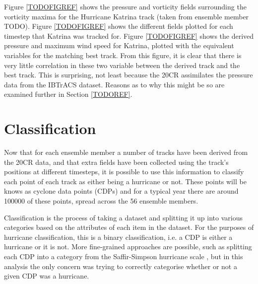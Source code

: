 \documentclass[pdftex,12pt,a4paper]{report}
\begin{document}
Figure \ref{TODOFIGREF} shows the pressure and vorticity fields surrounding the vorticity maxima for
the Hurricane Katrina track (taken from ensemble member TODO). Figure \ref{TODOFIGREF} shows the
different fields plotted for each timestep that Katrina was tracked for. Figure \ref{TODOFIGREF}
shows the derived pressure and maximum wind speed for Katrina, plotted with the equivalent variables
for the matching best track. From this figure, it is clear that there is very little correlation in
these two variable between the derived track and
the best track. This is surprising, not least because the 20CR assimilates the pressure data from
the IBTrACS dataset. Reasons as to why this might be so are examined further in Section
\ref{TODOREF}.




\section{Classification}


Now that for each ensemble member a number of tracks have been derived from the 20CR data, and that
extra fields have been collected using the track's positions at different timesteps, it is possible
to use this information to classify each point of each track as either being a hurricane or not.
These points will be knows as cyclone data points (CDPs) and for a typical year there are around
100000 of these points, spread across the 56 ensemble members.

Classification is the process of taking a dataset and splitting it up into various categories based
on the attributes of each item in the dataset. For the purposes of hurricane classification, this is
a binary classification, i.e. a CDP is either a hurricane or it is not. More fine-grained approaches
are possible, such as splitting each CDP into a category from the Saffir-Simpson hurricane scale
\parencite{simpson1974hurricane}, but in this analysis the only concern was trying to correctly categorise whether or
not a given CDP was a hurricane.
\end{document}
